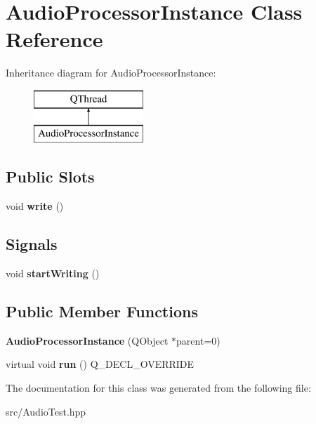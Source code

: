 \hypertarget{classAudioProcessorInstance}{\section{Audio\+Processor\+Instance Class Reference}
\label{classAudioProcessorInstance}
}
Inheritance diagram for Audio\+Processor\+Instance\+:\begin{figure}[H]
\begin{center}
\leavevmode
\includegraphics[height=2.000000cm]{classAudioProcessorInstance}
\end{center}
\end{figure}
\subsection*{Public Slots}
\begin{DoxyCompactItemize}
\item 
\hypertarget{classAudioProcessorInstance_a189a8cfa80d80c59179ea7f0ba6aa25d}{void {\bfseries write} ()}\label{classAudioProcessorInstance_a189a8cfa80d80c59179ea7f0ba6aa25d}

\end{DoxyCompactItemize}
\subsection*{Signals}
\begin{DoxyCompactItemize}
\item 
\hypertarget{classAudioProcessorInstance_a5c75fa4f596fc9e0b8fd049394b99fff}{void {\bfseries start\+Writing} ()}\label{classAudioProcessorInstance_a5c75fa4f596fc9e0b8fd049394b99fff}

\end{DoxyCompactItemize}
\subsection*{Public Member Functions}
\begin{DoxyCompactItemize}
\item 
\hypertarget{classAudioProcessorInstance_a1c8bfccd3b95be0b6d8e65595a5ce794}{{\bfseries Audio\+Processor\+Instance} (Q\+Object $\ast$parent=0)}\label{classAudioProcessorInstance_a1c8bfccd3b95be0b6d8e65595a5ce794}

\item 
\hypertarget{classAudioProcessorInstance_a560cd34c16cf1254f88647dceba53e42}{virtual void {\bfseries run} () Q\+\_\+\+D\+E\+C\+L\+\_\+\+O\+V\+E\+R\+R\+I\+D\+E}\label{classAudioProcessorInstance_a560cd34c16cf1254f88647dceba53e42}

\end{DoxyCompactItemize}


The documentation for this class was generated from the following file\+:\begin{DoxyCompactItemize}
\item 
src/Audio\+Test.\+hpp\end{DoxyCompactItemize}
